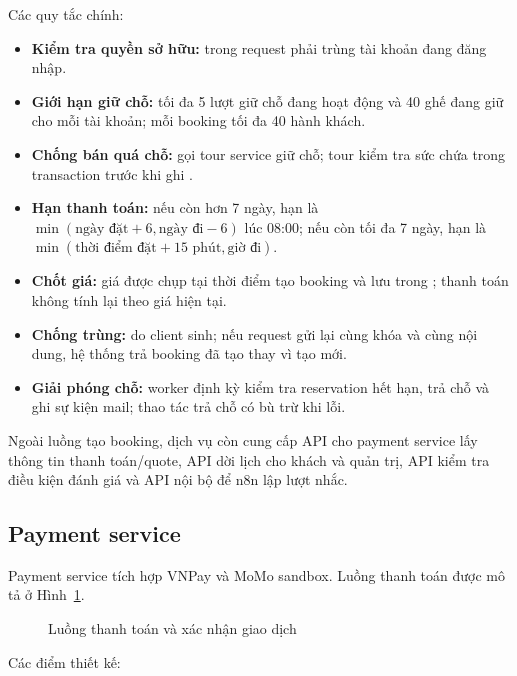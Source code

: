 Các quy tắc chính:

\begin{itemize}
  \item \textbf{Kiểm tra quyền sở hữu:}  trong request phải trùng tài khoản đang đăng nhập.
  \item \textbf{Giới hạn giữ chỗ:} tối đa 5 lượt giữ chỗ đang hoạt động và 40 ghế đang giữ cho mỗi tài khoản; mỗi booking tối đa 40 hành khách.
  \item \textbf{Chống bán quá chỗ:} gọi tour service giữ chỗ; tour kiểm tra sức chứa trong transaction trước khi ghi .
  \item \textbf{Hạn thanh toán:} nếu còn hơn 7 ngày, hạn là \(\min(\text{ngày đặt}+6, \text{ngày đi}-6)\) lúc 08:00; nếu còn tối đa 7 ngày, hạn là \(\min(\text{thời điểm đặt}+15\text{ phút}, \text{giờ đi})\).
  \item \textbf{Chốt giá:} giá được chụp tại thời điểm tạo booking và lưu trong ; thanh toán không tính lại theo giá hiện tại.
  \item \textbf{Chống trùng:}  do client sinh; nếu request gửi lại cùng khóa và cùng nội dung, hệ thống trả booking đã tạo thay vì tạo mới.
  \item \textbf{Giải phóng chỗ:} worker định kỳ kiểm tra reservation hết hạn, trả chỗ và ghi sự kiện mail; thao tác trả chỗ có bù trừ khi lỗi.
\end{itemize}

Ngoài luồng tạo booking, dịch vụ còn cung cấp API cho payment service lấy thông tin thanh toán/quote, API dời lịch cho khách và quản trị, API kiểm tra điều kiện đánh giá và API nội bộ để n8n lập lượt nhắc.

\subsection{Payment service}
\label{subsec:payment-service}

Payment service tích hợp VNPay và MoMo sandbox. Luồng thanh toán được mô tả ở Hình~\ref{fig:sequence-payment}.

\begin{figure}[H]
\centering
\resizebox{\textwidth}{!}{}
\caption{Luồng thanh toán và xác nhận giao dịch}
\label{fig:sequence-payment}
\end{figure}

Các điểm thiết kế:

